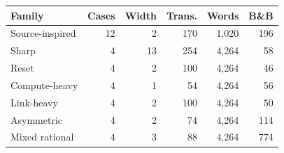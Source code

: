 \begin{tabular}{lrrrrr}
\toprule
Family & Cases & Width & Trans. & Words & B\&B\\\midrule
Source-inspired & 12 & 2 & 170 & 1,020 & 196\\
Sharp & 4 & 13 & 254 & 4,264 & 58\\
Reset & 4 & 2 & 100 & 4,264 & 46\\
Compute-heavy & 4 & 1 & 54 & 4,264 & 56\\
Link-heavy & 4 & 2 & 100 & 4,264 & 50\\
Asymmetric & 4 & 2 & 74 & 4,264 & 114\\
Mixed rational & 4 & 3 & 88 & 4,264 & 774\\
\bottomrule
\end{tabular}
